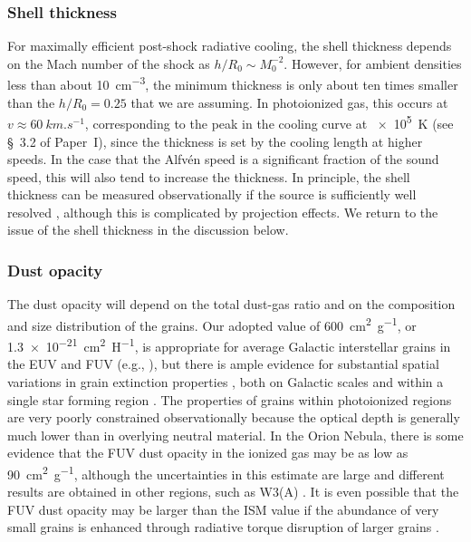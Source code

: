 \subsubsection{Shell thickness}
\label{sec:shell-thickness}
For maximally efficient post-shock radiative cooling, the shell
thickness depends on the Mach number of the shock as
\(h / R_0 \sim M_0^{-2}\).  However, for ambient densities less than
about \SI{10}{cm^{-3}}, the minimum thickness is only about ten times
smaller than the \(h / R_0 = 0.25\) that we are assuming.  In
photoionized gas, this occurs at \(v \approx \SI{60}{km.s^{-1}}\),
corresponding to the peak in the cooling curve at \SI{e5}{K} (see
\S~3.2 of Paper~I),
since the thickness is set by the cooling length at higher speeds.  In
the case that the Alfv\'en speed is a significant fraction of the
sound speed, this will also tend to increase the thickness.  In
principle, the shell thickness can be measured observationally if the
source is sufficiently well resolved \citep{Kobulnicky:2017a},
although this is complicated by projection effects.  We return to the
issue of the shell thickness in the discussion below.

\subsubsection{Dust opacity}
\label{sec:dust-opacity}
The dust opacity will depend on the total dust-gas ratio and on the
composition and size distribution of the grains.  Our adopted value of
\SI{600}{cm^2.g^{-1}}, or \SI{1.3e-21}{cm^2.H^{-1}}, is appropriate
for average Galactic interstellar grains in the EUV and FUV (e.g.,
\citealp{Weingartner:2001a}), but there is ample evidence for
substantial spatial variations in grain extinction properties
\citep{Fitzpatrick:2007a}, both on Galactic scales
\citep{Schlafly:2016a} and within a single star forming region
\citep{Beitia-Antero:2017a}.  The properties of grains within
photoionized regions are very poorly constrained observationally
because the optical depth is generally much lower than in overlying
neutral material.  In the Orion Nebula, there is some evidence
\citep{Salgado:2016a} that the FUV dust opacity in the ionized gas may
be as low as \SI{90}{cm^2.g^{-1}}, although the uncertainties in this
estimate are large and different results are obtained in other
regions, such as W3(A) \citep{Salgado:2012a}.  It is even possible
that the FUV dust opacity may be larger than the ISM value if the
abundance of very small grains is enhanced through radiative torque
disruption of larger grains \citep{Hoang:2018a}.


